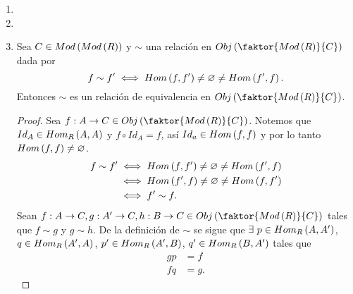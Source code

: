 \documentclass{article}
\begin{document}
\begin{enumerate}[label=\textbf{Ej \arabic*.}]
\begin{proof}
\begin{align*}
					\implies & \restrict{\overline{f}}{X}=f.
			\end{align*}
		Finalmente, sea $g:F\to N$ un morfismo de $R$-módulos tal que $\restrict{g}{X}=f$ y $a\in F$. Se tiene lo siguiente:
			\begin{align*}
				g\lrprth{a}&=g\lrprth{\sum_{x\in X_a}r_x x}\\
				&=\sum_{x\in X_a}r_x g\lrprth{x}\\
				&=\sum_{x\in X_a}r_x f\lrprth{x}\\
				&=\overline{f}(x).\\
				\implies & g=\overline{f}.
			\end{align*}
		\end{proof}
	
		\item 
		\item 
		\item Sea $C\in Mod\left(Mod\left(R\right)\right)$ y $\sim$ una relación en $Obj\lrprth{\faktor{Mod\lrprth{R}}{C}}$ dada por
		\begin{equation*}
			f\sim f'\iff Hom\left(f,f'\right)\neq\varnothing\neq Hom\left(f',f\right).
		\end{equation*}
		Entonces $\sim$ es un relación de equivalencia en $Obj\lrprth{\faktor{Mod\lrprth{R}}{C}}$.
		\begin{proof}
			 Sea $f:A\to C\in Obj\lrprth{\faktor{Mod\lrprth{R}}{C}}$. Notemos que $Id_A\in Hom_{R}\left(A,A\right)$ y $f\circ Id_A=f$, así $Id_a\in Hom\left(f,f\right)$ y por lo tanto $Hom\left(f,f\right)\neq\varnothing$.\\
			\begin{align*}
				f\sim f'&\iff  Hom\left(f,f'\right)\neq\varnothing\neq Hom\left(f',f\right)\\
				&\iff  Hom\left(f',f\right)\neq\varnothing\neq Hom\left(f,f'\right)\\
				&\iff f'\sim f.
			\end{align*}
			 Sean $f:A\to C,g:A'\to C, h:B\to C\in Obj\lrprth{\faktor{Mod\lrprth{R}}{C}}$ tales que $f\sim g$ y $g\sim h$. De la definición de $\sim$ se sigue que $\exists\ p\in\ringmodhom{R}{A}{A'}$, $q\in Hom_{R}\left(A',A\right)$, $p'\in Hom_{R}\left(A',B\right)$, $q'\in Hom_{R}\left(B,A'\right)$ tales que
			\begin{equation*}\label{fsimg}\tag{*}
				\begin{split}
					gp&=f\\
					fq&=g.
				\end{split}
			\end{equation*}

\end{proof}
\end{enumerate}
\end{document}
